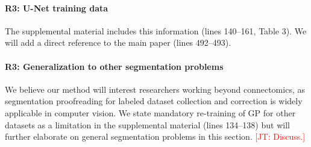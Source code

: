 \documentclass[10pt,twocolumn,letterpaper]{article}
\newcommand{\JT}[1]{\textcolor{red}{[JT: #1]}}
\begin{document}
\begin{table}[h]
\caption{Forced Choice User Experiment in adapted Rand Error (aRE) metric (lower is better). Novices and experts using GP perform better than using FP.}
\label{tab:randerror}
\end{table}



\paragraph{R3: U-Net training data} The supplemental material includes this information (lines 140--161, Table 3). We will add a direct reference to the main paper (lines 492--493).

\paragraph{R3: Generalization to other segmentation problems} We believe our method will interest researchers working beyond connectomics, as segmentation proofreading for labeled dataset collection and correction is widely applicable in computer vision. We state mandatory re-training of GP for other datasets as a limitation in the supplemental material (lines 134--138) but will further elaborate on general segmentation problems in this section. \JT{Discuss.}
\end{document}
